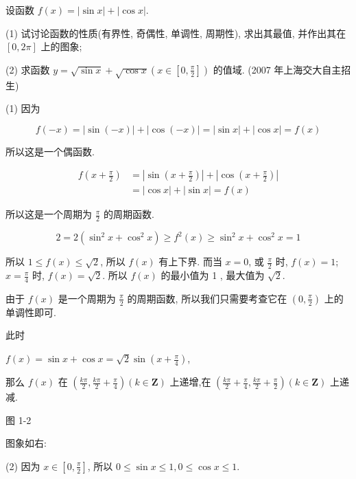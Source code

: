 \begin{example}
	设函数 $f(x)=|\sin x|+|\cos x|$. 
	
	(1) 试讨论函数的性质(有界性, 奇偶性, 单调性, 周期性), 求出其最值, 并作出其在 $[0,2 \pi]$ 上的图象;

	(2) 求函数 $y=\sqrt{\sin x}+\sqrt{\cos x}\left(x \in\left[0, \frac{\pi}{2}\right]\right)$ 的值域. (2007 年上海交大自主招生)

\end{example}
\begin{solution}
	(1) 因为

	$$
		f(-x)=|\sin (-x)|+|\cos (-x)|=|\sin x|+|\cos x|=f(x)
	$$

	所以这是一个偶函数.

	$$
		\begin{aligned}
			f\left(x+\frac{\pi}{2}\right) & =\left|\sin \left(x+\frac{\pi}{2}\right)\right|+\left|\cos \left(x+\frac{\pi}{2}\right)\right| \\
			                              & =|\cos x|+|\sin x|=f(x)
		\end{aligned}
	$$

	所以这是一个周期为 $\frac{\pi}{2}$ 的周期函数.

	$$
		2=2\left(\sin ^{2} x+\cos ^{2} x\right) \geqslant f^{2}(x) \geqslant \sin ^{2} x+\cos ^{2} x=1
	$$

	所以 $1 \leqslant f(x) \leqslant \sqrt{2}$, 所以 $f(x)$ 有上下界. 而当 $x=0$, 或 $\frac{\pi}{2}$ 时, $f(x)=1$;\\
	$x=\frac{\pi}{4}$ 时, $f(x)=\sqrt{2}$. 所以 $f(x)$ 的最小值为 1 , 最大值为 $\sqrt{2}$.

	由于 $f(x)$ 是一个周期为 $\frac{\pi}{2}$ 的周期函数, 所以我们只需要考查它在 $\left(0, \frac{\pi}{2}\right)$ 上的单调性即可.

	此时

	$f(x)=\sin x+\cos x=\sqrt{2} \sin \left(x+\frac{\pi}{4}\right)$,

	那么 $f(x)$ 在 $\left(\frac{k \pi}{2}, \frac{k \pi}{2}+\frac{\pi}{4}\right)(k \in \mathbf{Z})$ 上递增,在 $\left(\frac{k \pi}{2}+\frac{\pi}{4}, \frac{k \pi}{2}+\frac{\pi}{2}\right)(k \in \mathbf{Z})$ 上递减.


	图 1-2

	图象如右:

	(2) 因为 $x \in\left[0, \frac{\pi}{2}\right]$, 所以 $0 \leqslant \sin x \leqslant 1,0 \leqslant \cos x \leqslant 1$.


\end{solution}
